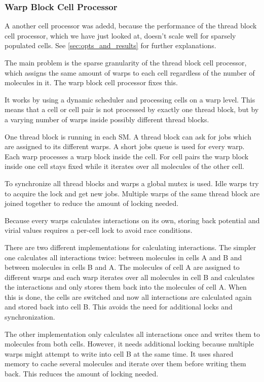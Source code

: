 \subsubsection{Warp Block Cell Processor}
A another cell processor was adedd, because the performance of the thread block cell processor, which we have just looked at, doesn't scale well for sparsely populated cells. See \autoref{sec:opts_and_results} for further explanations.

The main problem is the sparse granularity of the thread block cell processor, which assigns the same amount of warps to each cell regardless of the number of molecules in it. The warp block cell processor fixes this.

It works by using a dynamic scheduler and processing cells on a warp level. This means that a cell or cell pair is not processed by exactly one thread block, but by a varying number of warps inside possibly different thread blocks.

One thread block is running in each SM. A thread block can ask for jobs which are assigned to its different warps. A short jobs queue is used for every warp. Each warp processes a warp block inside the cell. For cell pairs the warp block inside one cell stays fixed while it iterates over all molecules of the other cell.

To synchronize all thread blocks and warps a global mutex is used. Idle warps try to acquire the lock and get new jobs. Multiple warps of the same thread block are joined together to reduce the amount of locking needed.

Because every warps calculates interactions on its own, storing back potential and virial values requires a per-cell lock to avoid race conditions.

There are two different implementations for calculating interactions. The simpler one calculates all  interactions twice: between molecules in cells A and B and between molecules in cells B and A.
The molecules of cell A are assigned to different warps and each warp iterates over all molecules in cell B and calculates the interactions and only stores them back into the molecules of cell A.
When this is done, the cells are switched and now all interactions are calculated again and stored back into cell B.
This avoids the need for additional locks and synchronization.


The other implementation only calculates all interactions once and writes them to molecules from both cells. However, it needs additional locking because multiple warps might attempt to write into cell B at the same time. It uses shared memory to cache several molecules and iterate over them before writing them back. This reduces the amount of locking needed.

